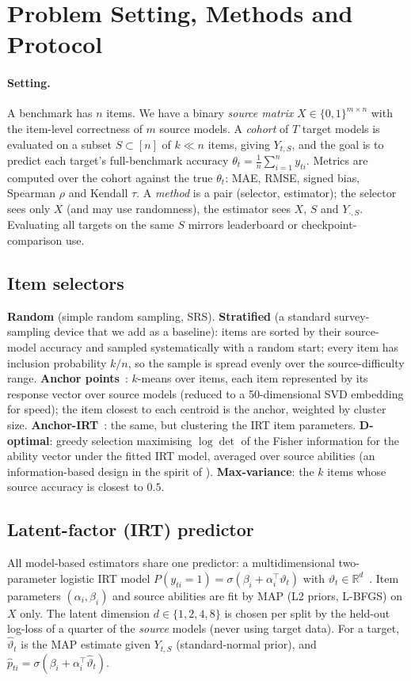 \section{Problem Setting, Methods and Protocol}
\label{sec:method}

\paragraph{Setting.}
A benchmark has $n$ items. We have a binary \emph{source matrix} $X\in\{0,1\}^{m\times n}$ with the item-level correctness of $m$ source models.
A \emph{cohort} of $T$ target models is evaluated on a subset $S\subset[n]$ of $k\ll n$ items, giving $Y_{t,S}$, and the goal is to predict each target's full-benchmark accuracy $\theta_t=\frac1n\sum_{i=1}^n y_{ti}$.
Metrics are computed over the cohort against the true $\theta_t$: MAE, RMSE, signed bias, Spearman $\rho$ and Kendall $\tau$.
A \emph{method} is a pair (selector, estimator); the selector sees only $X$ (and may use randomness), the estimator sees $X$, $S$ and $Y_{\cdot,S}$.
Evaluating all targets on the same $S$ mirrors leaderboard or checkpoint-comparison use.

\subsection{Item selectors}
\textbf{Random} (simple random sampling, SRS).
\textbf{Stratified} (a standard survey-sampling device that we add as a baseline): items are sorted by their source-model accuracy and sampled systematically with a random start; every item has inclusion probability $k/n$, so the sample is spread evenly over the source-difficulty range.
\textbf{Anchor points}~\citep{vivek2024anchor}: $k$-means over items, each item represented by its response vector over source models (reduced to a 50-dimensional SVD embedding for speed); the item closest to each centroid is the anchor, weighted by cluster size.
\textbf{Anchor-IRT}~\citep{maiapolo2024tiny}: the same, but clustering the IRT item parameters.
\textbf{D-optimal}: greedy selection maximising $\log\det$ of the Fisher information for the ability vector under the fitted IRT model, averaged over source abilities (an information-based design in the spirit of \citet{kipnis2025metabench}).
\textbf{Max-variance}: the $k$ items whose source accuracy is closest to $0.5$.

\subsection{Latent-factor (IRT) predictor}
All model-based estimators share one predictor: a multidimensional two-parameter logistic IRT model
$P(y_{ti}=1)=\sigma(\beta_i+\alpha_i^\top\vartheta_t)$ with $\vartheta_t\in\mathbb R^d$~\citep{lord1968statistical,reckase2009multidimensional,maiapolo2024tiny}.
Item parameters $(\alpha_i,\beta_i)$ and source abilities are fit by MAP (L2 priors, L-BFGS) on $X$ only.
The latent dimension $d\in\{1,2,4,8\}$ is chosen per split by the held-out log-loss of a quarter of the \emph{source} models (never using target data).
For a target, $\hat\vartheta_t$ is the MAP estimate given $Y_{t,S}$ (standard-normal prior), and $\hat p_{ti}=\sigma(\beta_i+\alpha_i^\top\hat\vartheta_t)$.

